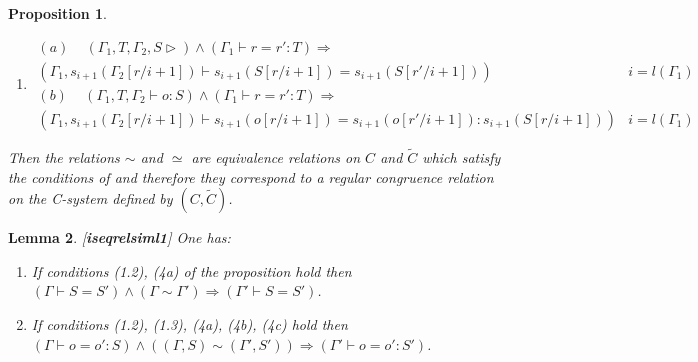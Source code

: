 \documentclass[11pt]{article}
\newtheorem{proposition}{Proposition}[subsection]
\newtheorem{lemma}[proposition]{Lemma}
\newcommand{\llabel}[1]{\label{#1}[{\bf #1}]}
\newcommand{\wt}{\widetilde}
\newcommand{\spc}{{\,\,\,\,\,\,\,}}
\newcommand{\impl}{{\Rightarrow}}
\begin{document}
\begin{proposition}
\begin{enumerate}
$$\begin{array}{ll}
(a)\spc (\Gamma_1,T,\Gamma_2\vdash S=S')\wedge(\Gamma_1\vdash r:T)\impl&\\
(\Gamma_1,s_{i+1}(\Gamma_2[r/i+1])\vdash s_{i+1}(S[r/i+1])=s_{i+1}(S'[r/i+1]))&i=l(\Gamma_1)\\
(b)\spc (\Gamma_1,T,\Gamma_2\vdash o=o':S)\wedge(\Gamma_1\vdash r:T)\impl&\\
(\Gamma_1,s_{i+1}(\Gamma_2[r/i+1])\vdash s_{i+1}(o[r/i+1])=s_{i+1}(o'[r/i+1]):s_{i+1}(S[r/i+1]))&i=l(\Gamma_1)
\end{array}
$$
%
\item 
%
$$
\begin{array}{ll}
(a)\spc (\Gamma_1,T,\Gamma_2,S\rhd)\wedge(\Gamma_1\vdash r=r':T)\impl&\\
(\Gamma_1,s_{i+1}(\Gamma_2[r/i+1])\vdash s_{i+1}(S[r/i+1])=s_{i+1}(S[r'/i+1]))&i=l(\Gamma_1)\\
(b)\spc (\Gamma_1,T,\Gamma_2\vdash o:S)\wedge(\Gamma_1\vdash r=r':T)\impl&\\
(\Gamma_1,s_{i+1}(\Gamma_2[r/i+1])\vdash s_{i+1}(o[r/i+1])=s_{i+1}(o[r'/i+1]):s_{i+1}(S[r/i+1]))&i=l(\Gamma_1)
\end{array}
$$
\end{enumerate}
%
Then the relations $\sim$ and $\simeq$ are equivalence relations on $C$ and $\wt{C}$ which satisfy the conditions of \cite[Proposition 5.4]{Csubsystems} and therefore they correspond to a regular congruence relation on the C-system defined by $(C,\wt{C})$. 
\end{proposition}
%
\begin{lemma}
\llabel{iseqrelsiml1}
One has:
%
\begin{enumerate}
\item If conditions (1.2), (4a) of the proposition hold then $(\Gamma\vdash S=S')\wedge(\Gamma\sim\Gamma')\impl (\Gamma'\vdash S=S')$.
\item If conditions (1.2), (1.3), (4a), (4b), (4c) hold then $(\Gamma\vdash o=o':S)\wedge((\Gamma,S)\sim(\Gamma',S'))\impl (\Gamma'\vdash o=o':S')$.
\end{enumerate}
\end{lemma}
%
\end{document}
